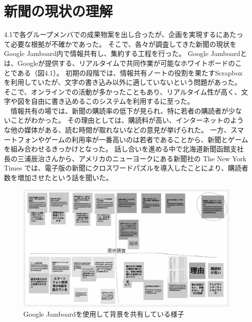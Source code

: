 \section{新聞の現状の理解}
4.1で各グループメンバでの成果物案を出し合ったが、企画を実現するにあたって必要な根拠が不確かであった。
そこで、各々が調査してきた新聞の現状をGoogle Jamboard内で情報共有し、集約する工程を行った。
Google Jamboardとは、Googleが提供する、リアルタイムで共同作業が可能なホワイトボードのことである（図4.1）。
初期の段階では、情報共有ノートの役割を果たすScrapboxを利用していたが、文字の書き込み以外に適していないという問題があった。
そこで、オンラインでの活動が多かったこともあり、リアルタイム性が高く、文字や図を自由に書き込めるこのシステムを利用するに至った。\\
　情報共有の場では、新聞の購読率の低下が見られ、特に若者の購読者が少ないことがわかった。
その理由としては、購読料が高い、インターネットのような他の媒体がある、読む時間が取れないなどの意見が挙げられた。
一方、スマートフォンやゲームの利用率が一番高いのは若者であることから、新聞とゲームを組み合わせるきっかけとなった。
話し合いを進める中で北海道新聞函館支社長の三浦辰治さんから、アメリカのニューヨークにある新聞社の The New York Times では、電子版の新聞にクロスワードパズルを導入したことにより、購読者数を増加させたという話を聞いた。
\newpage
\begin{figure}[htbp]
    \centering
    \includegraphics[width=12cm]{images/Project_Research.png}
    \caption{Google Jamboardを使用して背景を共有している様子}
\end{figure}

